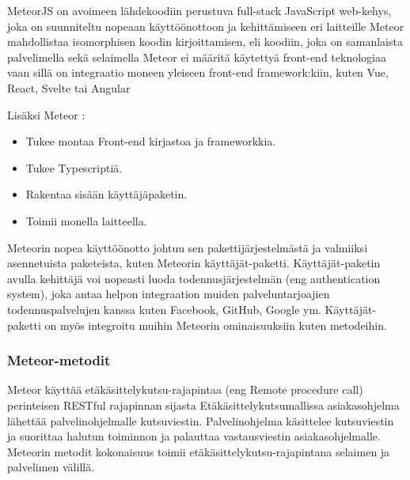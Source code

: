 









MeteorJS on avoimeen lähdekoodiin perustuva full-stack JavaScript web-kehys, joka on 
suunniteltu nopeaan käyttöönottoon ja kehittämiseen eri laitteille
Meteor mahdollistaa isomorphisen koodin kirjoittamisen, eli koodiin, joka on samanlaista palvelimella sekä selaimella %
Meteor ei määritä käytettyä front-end teknologiaa vaan sillä on integraatio moneen yleiseen front-end framework:kiin, kuten Vue, React, Svelte tai Angular
\medskip



    

Lisäksi Meteor :
\begin{itemize}
    \item Tukee montaa Front-end kirjastoa ja frameworkkia.
    \item Tukee Typescriptiä.
    \item Rakentaa sisään käyttäjäpaketin.
    \item Toimii monella laitteella.
\end{itemize}
\medskip


Meteorin nopea käyttöönotto johtuu sen pakettijärjestelmästä ja valmiiksi asennetuista paketeista, kuten Meteorin käyttäjät-paketti. 
Käyttäjät-paketin avulla kehittäjä voi nopeasti luoda todennusjärjestelmän (eng authentication system),
joka antaa helpon integraation muiden palveluntarjoajien todennuspalvelujen kanssa kuten Facebook, GitHub, Google ym.
Käyttäjät-paketti on myös integroitu muihin Meteorin ominaisuuksiin kuten metodeihin.



\subsubsection{Meteor-metodit}



Meteor käyttää etäkäsittelykutsu-rajapintaa (eng Remote procedure call) perinteisen RESTful rajapinnan sijasta
Etäkäsittelykutsumallissa asiakasohjelma lähettää palvelinohjelmalle kutsuviestin.
Palvelinohjelma käsittelee kutsuviestin ja suorittaa halutun toiminnon ja palauttaa vastausviestin asiakasohjelmalle.
Meteorin metodit kokonaisuus toimii etäkäsittelykutsu-rajapintana selaimen ja palvelimen välillä. 
\medskip



